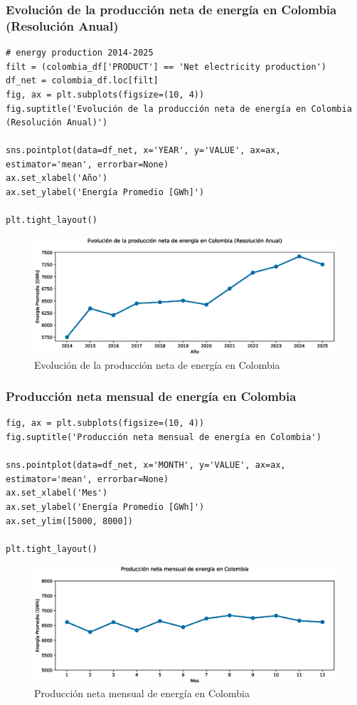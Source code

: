 \documentclass{article}
\begin{document}
\subsubsection{Evolución de la producción neta de energía en Colombia (Resolución Anual)}

\begin{verbatim}
# energy production 2014-2025
filt = (colombia_df['PRODUCT'] == 'Net electricity production')
df_net = colombia_df.loc[filt]
fig, ax = plt.subplots(figsize=(10, 4))
fig.suptitle('Evolución de la producción neta de energía en Colombia (Resolución Anual)')

sns.pointplot(data=df_net, x='YEAR', y='VALUE', ax=ax, estimator='mean', errorbar=None)
ax.set_xlabel('Año')
ax.set_ylabel('Energía Promedio [GWh]')

plt.tight_layout()
\end{verbatim}

\begin{figure}[t]
	\centering
	\includegraphics[width=0.7\linewidth]{fig_4}
	\caption{Evolución de la producción neta de energía en Colombia}
	\label{fig:fig4}
\end{figure}

\subsubsection{Producción neta mensual de energía en Colombia}

\begin{verbatim}
fig, ax = plt.subplots(figsize=(10, 4))
fig.suptitle('Producción neta mensual de energía en Colombia')

sns.pointplot(data=df_net, x='MONTH', y='VALUE', ax=ax, estimator='mean', errorbar=None)
ax.set_xlabel('Mes')
ax.set_ylabel('Energía Promedio [GWh]')
ax.set_ylim([5000, 8000])

plt.tight_layout()
\end{verbatim}

\begin{figure}[t]
	\centering
	\includegraphics[width=0.7\linewidth]{fig_5}
	\caption{Producción neta mensual de energía en Colombia}
	\label{fig:fig5}
\end{figure}
\end{document}
